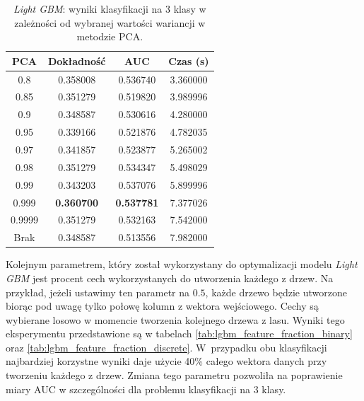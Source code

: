 \documentclass[a4paper, twoside, 11pt, openright]{article}
\begin{document}
\begin{table}[H]
    \centering
    \begin{tabular}{|c|c|c|c|}
    \hline
        \textbf{PCA} & \textbf{Dokładność} & \textbf{AUC} & \textbf{Czas (s)} \\ \hline
0.8                &  0.358008 &  0.536740 &    3.360000 \\ \hline
0.85               &  0.351279 &  0.519820 &    3.989996 \\ \hline
0.9                &  0.348587 &  0.530616 &    4.280000 \\ \hline
0.95               &  0.339166 &  0.521876 &    4.782035 \\ \hline
0.97               &  0.341857 &  0.523877 &    5.265002 \\ \hline
0.98               &  0.351279 &  0.534347 &    5.498029 \\ \hline
0.99               &  0.343203 &  0.537076 &    5.899996 \\ \hline
0.999			   &  \textbf{0.360700} &   \textbf{0.537781} &    7.377026 \\ \hline
0.9999             &  0.351279 &  0.532163 &    7.542000 \\ \hline
Brak                &  0.348587 &  0.513556 &    7.982000 \\ \hline
    \end{tabular}
    \caption{\textit{Light GBM}: wyniki klasyfikacji na 3 klasy w zależności od wybranej wartości wariancji w metodzie PCA.}
    \label{tab:lgbm_pca_discrete}
\end{table}

Kolejnym parametrem, który został wykorzystany do optymalizacji modelu \textit{Light GBM} jest procent cech wykorzystanych do utworzenia każdego z drzew. Na przykład, jeżeli ustawimy ten parametr na $0.5$, każde drzewo będzie utworzone biorąc pod uwagę tylko połowę kolumn z wektora wejściowego. Cechy są wybierane losowo w momencie tworzenia kolejnego drzewa z lasu. Wyniki tego eksperymentu przedstawione są w tabelach \ref{tab:lgbm_feature_fraction_binary} oraz \ref{tab:lgbm_feature_fraction_discrete}. W~przypadku obu klasyfikacji najbardziej korzystne wyniki daje użycie 40\% całego wektora danych przy tworzeniu każdego z drzew. Zmiana tego parametru pozwoliła na poprawienie miary AUC w szczególności dla problemu klasyfikacji na 3 klasy.
\end{document}
